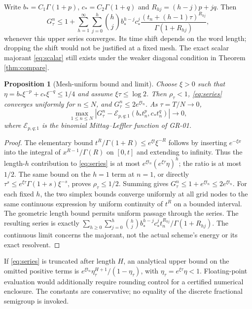 \documentclass[11pt,a4paper]{article}
\newtheorem{proposition}{Proposition}
\begin{document}
Write $b_*=C_1\Gamma(1+p)$, $c_*=C_2\Gamma(1+q)$ and $R_{hj}=(h-j)p+jq$. Then
\begin{equation}\label{eq:series}
 G_\tau^n\le 1+\sum_{h=1}^\infty\sum_{j=0}^h
 \binom hj b_*^{h-j}c_*^j
 \frac{(t_n+(h-1)\tau)^{R_{hj}}}{\Gamma(1+R_{hj})},
\end{equation}
whenever this upper series converges. Its time shift depends on the word length; dropping the shift would not be justified at a fixed mesh. The exact scalar majorant \eqref{eq:scalar} still exists under the weaker diagonal condition in Theorem \ref{thm:compare}.
\begin{proposition}[Mesh-uniform bound and limit]\label{prop:limit}
Choose $\xi>0$ such that $\eta=b_*\xi^{-p}+c_*\xi^{-q}\le1/4$ and assume $\xi\tau\le\log 2$. Then $\rho_\tau<1$, \eqref{eq:series} converges uniformly for $n\le N$, and $G_\tau^n\le2e^{\xi t_n}$. As $\tau=T/N\to0$,
\[
 \max_{1\le n\le N}\left|G_\tau^n-\mathcal E_{p,q;1}(b_*t_n^p,c_*t_n^q)\right|\to0,
\]
where $\mathcal E_{p,q;1}$ is the binomial Mittag--Leffler function of GR-01.
\end{proposition}
\begin{proof}
The elementary bound $t^R/\Gamma(1+R)\le e^{\xi t}\xi^{-R}$ follows by inserting $e^{-\xi x}$ into the integral of $x^{R-1}/\Gamma(R)$ on $[0,t]$ and extending to infinity. Thus the length-$h$ contribution to \eqref{eq:series} is at most $e^{\xi t_n}(e^{\xi\tau}\eta)^h$; the ratio is at most $1/2$. The same bound on the $h=1$ term at $n=1$, or directly $\tau^s\le e^{\xi\tau}\Gamma(1+s)\xi^{-s}$, proves $\rho_\tau\le1/2$. Summing gives $G_\tau^n\le 1+e^{\xi t_n}\le2e^{\xi t_n}$. For each fixed $h$, the two simplex bounds converge uniformly at all grid nodes to the same continuous expression by uniform continuity of $t^R$ on a bounded interval. The geometric length bound permits uniform passage through the series. The resulting series is exactly $\sum_{h\ge0}\sum_{j=0}^h\binom hj b_*^{h-j}c_*^jt_n^{R_{hj}}/\Gamma(1+R_{hj})$. The continuous limit concerns the majorant, not the actual scheme's energy or its exact resolvent.
\end{proof}
If \eqref{eq:series} is truncated after length $H$, an analytical upper bound on the omitted positive terms is $e^{\xi t_n}\eta_\tau^{H+1}/(1-\eta_\tau)$, with $\eta_\tau=e^{\xi\tau}\eta<1$. Floating-point evaluation would additionally require rounding control for a certified numerical enclosure. The constants are conservative; no equality of the discrete fractional semigroup is invoked.
\end{document}
